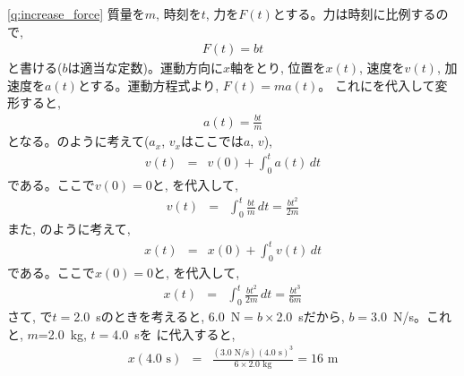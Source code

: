 \ref{q:increase_force} 
質量を$m$, 時刻を$t$, 力を$F(t)$とする。力は時刻に比例するので, 
\begin{eqnarray}
F(t)=bt\label{eq:increase_force}
\end{eqnarray}
と書ける($b$は適当な定数)。運動方向に$x$軸をとり, 
位置を$x(t)$, 速度を$v(t)$, 加速度を$a(t)$とする。運動方程式より, $F(t)=ma(t)$。
これにを代入して変形すると,
\begin{eqnarray}
a(t)=\frac{bt}{m}\label{eq:increase_force2}
\end{eqnarray}
となる。のように考えて($a_x$, $v_x$はここでは$a$, $v$), 
\begin{eqnarray}
v(t)&=&v(0)+\int_{0}^{t}a(t)\, dt\label{eq:increase_force3}
\end{eqnarray}
である。ここで$v(0)=0$と, を代入して, 
\begin{eqnarray}
v(t)&=&\int_{0}^{t}\frac{bt}{m}\, dt=\frac{bt^2}{2m}\label{eq:increase_force4}
\end{eqnarray}
また, のように考えて, 
\begin{eqnarray}
x(t)&=&x(0)+\int_{0}^{t}v(t)\, dt
\end{eqnarray}
である。ここで$x(0)=0$と, を代入して, 
\begin{eqnarray}
x(t)&=&\int_{0}^{t}\frac{bt^2}{2m}\, dt=\frac{bt^3}{6m}\label{eq:increase_force6}
\end{eqnarray}
さて, で$t=$2.0~sのときを考えると, 
6.0~N$=b\times$2.0~sだから, $b=3.0$~N/s。これと, $m$=2.0~kg, $t=$4.0~sを
に代入すると, 
\begin{eqnarray}
x(4.0\text{ s})&=&\frac{(3.0\text{ N/s})(4.0\text{ s})^3}{6\times 2.0\text{ kg}}=16\text{ m}
\end{eqnarray}
\mv

